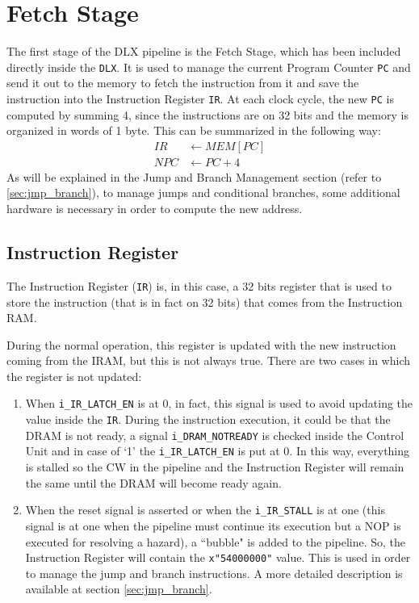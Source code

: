 \chapter{Fetch Stage}
The first stage of the DLX pipeline is the Fetch Stage, which has been included directly inside the \texttt{DLX}. It is used to manage the current Program Counter \texttt{PC} and send it out to the memory to fetch the instruction from it and save the instruction into the Instruction Register \texttt{IR}. At each clock cycle, the new \texttt{PC} is computed by summing 4, since the instructions are on 32 bits and the memory is organized in words of 1 byte. This can be summarized in the following way:
\begin{align*}
    IR &\leftarrow MEM[PC]\\
    NPC &\leftarrow PC + 4
\end{align*}
As will be explained in the Jump and Branch Management section (refer to \ref{sec:jmp_branch}), to manage jumps and conditional branches, some additional hardware is necessary in order to compute the new address.

\section{Instruction Register}
The Instruction Register (\texttt{IR}) is, in this case, a 32 bits register that is used to store the instruction (that is in fact on 32 bits) that comes from the Instruction RAM.

During the normal operation, this register is updated with the new instruction coming from the IRAM, but this is not always true. There are two cases in which the register is not updated:
\begin{enumerate}
    \item When \texttt{i\_IR\_LATCH\_EN} is at 0, in fact, this signal is used to avoid updating the value inside the \texttt{IR}. During the instruction execution, it could be that the DRAM is not ready, a signal \texttt{i\_DRAM\_NOTREADY} is checked inside the Control Unit and in case of `1' the \texttt{i\_IR\_LATCH\_EN} is put at 0. In this way, everything is stalled so the CW in the pipeline and the Instruction Register will remain the same until the DRAM will become ready again. 
    \item When the reset signal is asserted or when the \texttt{i\_IR\_STALL} is at one (this signal is at one when the pipeline must continue its execution but a NOP is executed for resolving a hazard), a ``bubble" is added to the pipeline. So, the Instruction Register will contain the \texttt{x"54000000"} value. This is used in order to manage the jump and branch instructions. A more detailed description is available at section \ref{sec:jmp_branch}.
\end{enumerate}

